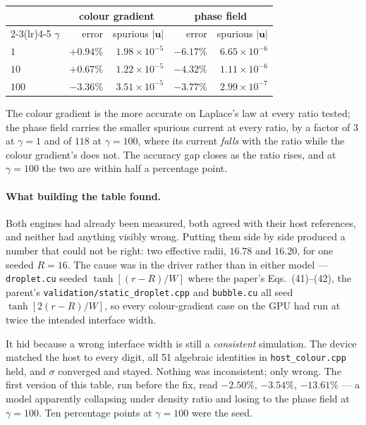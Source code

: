 \documentclass[11pt,a4paper]{article}
\newcommand{\code}[1]{\texttt{\small #1}}
\newcommand{\uu}{\bm{u}}
\newcommand{\e}[1]{\times 10^{#1}}
\begin{document}
\begin{center}
\begin{tabular}{lrrrr}
\toprule
 & \multicolumn{2}{c}{colour gradient} & \multicolumn{2}{c}{phase field} \\
\cmidrule(lr){2-3}\cmidrule(lr){4-5}
$\gamma$ & error & spurious $|\uu|$ & error & spurious $|\uu|$ \\
\midrule
$1$   & $+0.94\%$ & $1.98\e{-5}$ & $-6.17\%$ & $6.65\e{-6}$ \\
$10$  & $+0.67\%$ & $1.22\e{-5}$ & $-4.32\%$ & $1.11\e{-6}$ \\
$100$ & $-3.36\%$ & $3.51\e{-5}$ & $-3.77\%$ & $2.99\e{-7}$ \\
\bottomrule
\end{tabular}
\end{center}

The colour gradient is the more accurate on Laplace's law at every ratio tested;
the phase field carries the smaller spurious current at every ratio, by a factor
of $3$ at $\gamma = 1$ and of $118$ at $\gamma = 100$, where its current
\emph{falls} with the ratio while the colour gradient's does not. The accuracy
gap closes as the ratio rises, and at $\gamma = 100$ the two are within half a
percentage point.

\paragraph{What building the table found.} Both engines had already been
measured, both agreed with their host references, and neither had anything
visibly wrong. Putting them side by side produced a number that could not be
right: two effective radii, $16.78$ and $16.20$, for one seeded $R = 16$. The
cause was in the driver rather than in either model --- \code{droplet.cu} seeded
$\tanh[(r-R)/W]$ where the paper's Eqs.~(41)--(42), the parent's
\code{validation/static\_droplet.cpp} and \code{bubble.cu} all seed
$\tanh[2(r-R)/W]$, so every colour-gradient case on the GPU had run at twice the
intended interface width.

It hid because a wrong interface width is still a \emph{consistent} simulation.
The device matched the host to every digit, all 51 algebraic identities in
\code{host\_colour.cpp} held, and $\sigma$ converged and stayed. Nothing was
inconsistent; only wrong. The first version of this table, run before the fix,
read $-2.50\%$, $-3.54\%$, $-13.61\%$ --- a model apparently collapsing under
density ratio and losing to the phase field at $\gamma = 100$. Ten percentage
points at $\gamma = 100$ were the seed.
\end{document}
